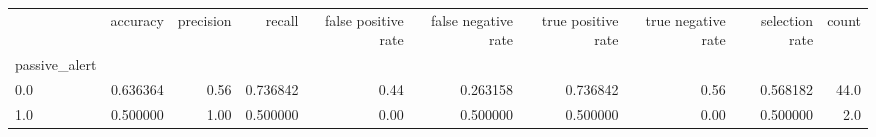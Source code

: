 \begin{tabular}{lrrrrrrrrr}
\toprule
{} &  accuracy &  precision &    recall &  false positive rate &  false negative rate &  true positive rate &  true negative rate &  selection rate &  count \\
passive\_alert &           &            &           &                      &                      &                     &                     &                 &        \\
\midrule
0.0           &  0.636364 &       0.56 &  0.736842 &                 0.44 &             0.263158 &            0.736842 &                0.56 &        0.568182 &   44.0 \\
1.0           &  0.500000 &       1.00 &  0.500000 &                 0.00 &             0.500000 &            0.500000 &                0.00 &        0.500000 &    2.0 \\
\bottomrule
\end{tabular}
